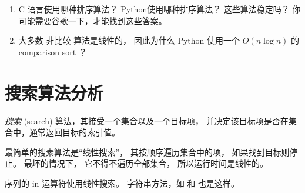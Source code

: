 \begin{exercise}
\begin{enumerate}
\item C 语言使用哪种排序算法？ Python使用哪种排序算法？ 这些算法稳定吗？ 你可能需要谷歌一下，才能找到这些答案。


\item 大多数 非比较 算法是线性的， 因此为什么 Python 使用一个 $O(n \log n)$ 的 comparison sort ？

\end{enumerate}

\end{exercise}


\section{搜索算法分析}


{ \em 搜索} (search) 算法，其接受一个集合以及一个目标项，
并决定该目标项是否在集合中，通常返回目标的索引值。
  


最简单的搜素算法是``线性搜索''， 其按顺序遍历集合中的项， 如果找到目标则停止。 最坏的情况下， 它不得不遍历全部集合， 所以运行时间是线性的。


序列的 in 运算符使用线性搜索。 字符串方法，如  和  也是这样。


